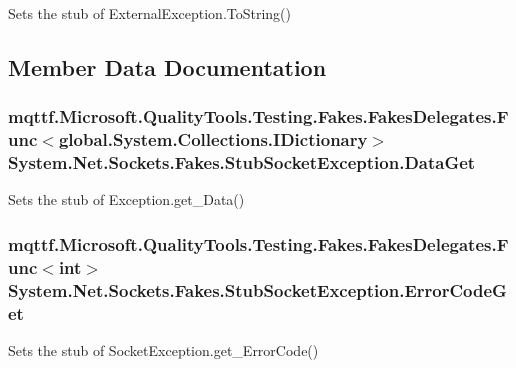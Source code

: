 Sets the stub of External\-Exception.\-To\-String()



\subsection{Member Data Documentation}
\hypertarget{class_system_1_1_net_1_1_sockets_1_1_fakes_1_1_stub_socket_exception_a0fed105ab6046eee7f5edc7597419f3a}{
\subsubsection[{Data\-Get}]{\setlength{\rightskip}{0pt plus 5cm}mqttf.\-Microsoft.\-Quality\-Tools.\-Testing.\-Fakes.\-Fakes\-Delegates.\-Func$<$global.\-System.\-Collections.\-I\-Dictionary$>$ System.\-Net.\-Sockets.\-Fakes.\-Stub\-Socket\-Exception.\-Data\-Get}}\label{class_system_1_1_net_1_1_sockets_1_1_fakes_1_1_stub_socket_exception_a0fed105ab6046eee7f5edc7597419f3a}


Sets the stub of Exception.\-get\-\_\-\-Data()

\hypertarget{class_system_1_1_net_1_1_sockets_1_1_fakes_1_1_stub_socket_exception_a86a4f00c75d2f00219fdc7b67844245b}{
\subsubsection[{Error\-Code\-Get}]{\setlength{\rightskip}{0pt plus 5cm}mqttf.\-Microsoft.\-Quality\-Tools.\-Testing.\-Fakes.\-Fakes\-Delegates.\-Func$<$int$>$ System.\-Net.\-Sockets.\-Fakes.\-Stub\-Socket\-Exception.\-Error\-Code\-Get}}\label{class_system_1_1_net_1_1_sockets_1_1_fakes_1_1_stub_socket_exception_a86a4f00c75d2f00219fdc7b67844245b}


Sets the stub of Socket\-Exception.\-get\-\_\-\-Error\-Code()

